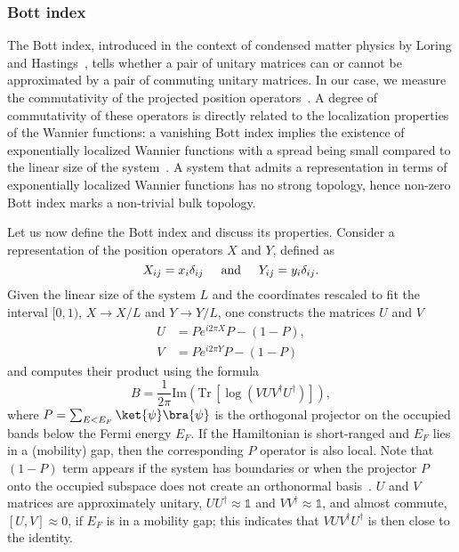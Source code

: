 \subsubsection{Bott index}
The Bott index, introduced in the context of condensed matter physics by Loring and Hastings~\cite{BottIdx}, tells whether a pair of unitary matrices can or cannot be approximated by a pair of commuting unitary matrices. In our case, we measure the commutativity of the projected position operators~\cite{LORING2015383}. A degree of commutativity of these operators is directly related to the localization properties of the Wannier functions: a vanishing Bott index implies the existence of exponentially localized Wannier functions with a spread being small compared to the linear size of the system~\cite{HASTINGS20111699, monaco2016localization}. A system that admits a representation in terms of exponentially localized Wannier functions has no strong topology, hence non-zero Bott index marks a non-trivial bulk topology.

Let us now define the Bott index and discuss its properties. Consider a representation of the position operators $X$ and $Y$, defined as
\begin{equation}
X_{ij} = x_i \delta_{ij} \hspace*{0.5cm} \mathrm{and} \hspace*{0.5cm} Y_{ij} = y_i \delta_{ij}.
\end{equation}
Given the linear size of the system $L$ and the coordinates rescaled to fit the interval $[0, 1)$, $X \rightarrow X / L$ and $Y \rightarrow Y/ L$, one constructs the matrices $U$ and $V$
\begin{equation}
\begin{aligned}
U &= P e^{i 2 \pi X} P  - (1 - P), \\ 
V &= P e^{i 2 \pi Y} P - (1 - P)
\end{aligned}
\end{equation}
and computes their product using the formula
\begin{equation}
B = \frac{1}{2 \pi} \mathrm{Im} \left( \mathrm{Tr} \, [ \log (V U V^{\dagger} U^{\dagger} ) ] \right), 
\label{eq:bott}
\end{equation}
where $P = \sum_{E < E_F} \ket{\psi} \bra{\psi} $ is the orthogonal projector on the occupied bands below the Fermi energy $E_F$. If the Hamiltonian is short-ranged and $E_F$ lies in a (mobility) gap, then the corresponding $P$ operator is also local. Note that $(1-P)$ term appears if the system has boundaries or when the projector $P$ onto the occupied subspace does not create an orthonormal basis~\cite{loring2019guide}. $U$ and $V$ matrices are approximately unitary, $U U^{\dagger} \approx \mathbb{1}$ and $V V^{\dagger} \approx \mathbb{1}$, and almost commute, $[U, V] \approx 0$, if $E_F$ is in a mobility gap; this indicates that $V U V^{\dagger} U^{\dagger}$ is then close to the identity.

